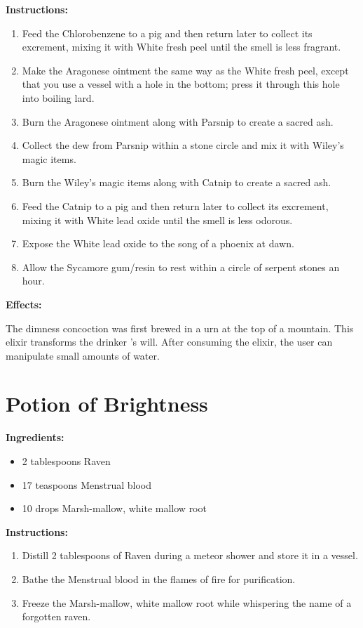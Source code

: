 \documentclass{article}
\begin{document}
\textbf{Instructions:}

\begin{enumerate}
  \item Feed the Chlorobenzene to a pig and then return later to collect its excrement, mixing it with White fresh peel until the smell is less fragrant.
  \item Make the Aragonese ointment the same way as the White fresh peel, except that you use a vessel with a hole in the bottom; press it through this hole into boiling lard.
  \item Burn the Aragonese ointment along with Parsnip to create a sacred ash.
  \item Collect the dew from Parsnip within a stone circle and mix it with Wiley's magic items.
  \item Burn the Wiley's magic items along with Catnip to create a sacred ash.
  \item Feed the Catnip to a pig and then return later to collect its excrement, mixing it with White lead oxide until the smell is less odorous.
  \item Expose the White lead oxide to the song of a phoenix at dawn.
  \item Allow the Sycamore gum/resin to rest within a circle of serpent stones an hour.
\end{enumerate}

\textbf{Effects:}

The dimness concoction was first brewed in a urn at the top of a mountain. This elixir transforms the drinker 's will. After consuming the elixir, the user can manipulate small amounts of water.

\newpage
\section*{Potion of Brightness}

\textbf{Ingredients:}

\begin{itemize}
  \item 2 tablespoons Raven
  \item 17 teaspoons Menstrual blood
  \item 10 drops Marsh-mallow, white mallow root
\end{itemize}

\textbf{Instructions:}

\begin{enumerate}
  \item Distill 2 tablespoons of Raven during a meteor shower and store it in a vessel.
  \item Bathe the Menstrual blood in the flames of fire for purification.
  \item Freeze the Marsh-mallow, white mallow root while whispering the name of a forgotten raven.
\end{enumerate}
\end{document}
